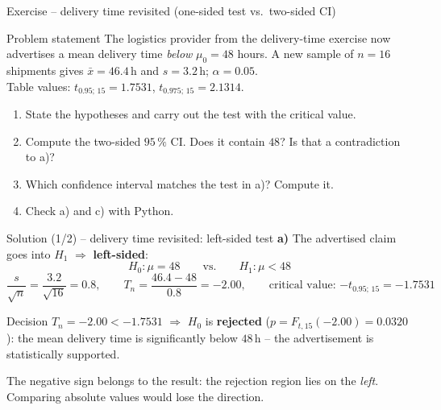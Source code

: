 \documentclass[aspectratio=169,11pt]{beamer}
\begin{document}
\begin{frame}{Exercise -- delivery time revisited (one-sided test vs.\ two-sided CI)}
  \begin{block}{Problem statement}
    The logistics provider from the delivery-time exercise now advertises a
    mean delivery time \emph{below} $\mu_0=48$ hours. A new sample of $n=16$
    shipments gives $\bar x=46.4$\,h and $s=3.2$\,h; $\alpha=0.05$.\\[2pt]
    {\footnotesize Table values: $t_{0.95;\,15}=1.7531$, $t_{0.975;\,15}=2.1314$.}
  \end{block}
  \begin{enumerate}\setlength{\itemsep}{2pt}
    \item[a)] State the hypotheses and carry out the test with the critical
              value.
    \item[b)] Compute the two-sided $95\,\%$ CI. Does it contain $48$? Is that
              a contradiction to a)?
    \item[c)] Which confidence interval matches the test in a)? Compute it.
    \item[d)] Check a) and c) with Python.
  \end{enumerate}
\end{frame}

\begin{frame}{Solution (1/2) -- delivery time revisited: left-sided test}
  \textbf{a)} The advertised claim goes into $H_1$ $\Rightarrow$
  \textbf{left-sided}:
  \[
    H_0:\mu=48 \qquad\text{vs.}\qquad H_1:\mu<48
  \]
  \[
    \frac{s}{\sqrt n}=\frac{3.2}{\sqrt{16}}=0.8,\qquad
    T_n=\frac{46.4-48}{0.8}=\mathbf{-2.00},\qquad
    \text{critical value: }{-t_{0.95;\,15}}=\mathbf{-1.7531}
  \]
  \begin{alertblock}{Decision}
    $T_n=-2.00<-1.7531$ $\Rightarrow$ $H_0$ is \textbf{rejected}
    ($p=F_{t,15}(-2.00)=0.0320$): the mean delivery time is significantly
    below $48$\,h -- the advertisement is statistically supported.
  \end{alertblock}
  {\small The negative sign belongs to the result: the rejection region lies on
  the \emph{left}. Comparing absolute values would lose the direction.}
\end{frame}
\end{document}

